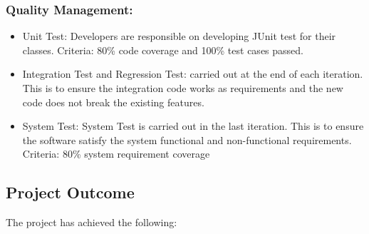 \documentclass[11pt]{article}
\begin{document}
	\subsubsection{Quality Management: } 
	\begin{itemize}
    \item Unit Test: Developers are responsible on developing JUnit test for their classes. Criteria: 80\% code coverage and 100\% test cases passed. 
    \item Integration Test and Regression Test: carried out at the end of each iteration. This is to ensure the integration code works as requirements and the new code does not break the existing features. 
    \item System Test: System Test is carried out in the last iteration. This is to ensure the software satisfy the system functional and non-functional requirements. Criteria: 80\% system requirement coverage
	\end{itemize}
	
	



\subsection{Project Outcome} \newline
\indent The project has achieved the following:
\end{document}

